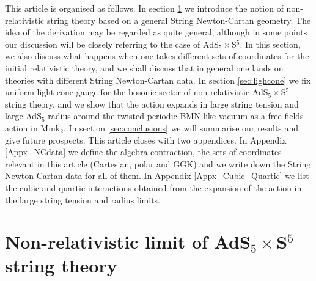 \documentclass[12pt]{article}
\numberwithin{equation}{section}
\begin{document}
This article is organised as follows.  In section \ref{sec:non_rel_general} we introduce the notion of non-relativistic string theory based on a general String Newton-Cartan geometry. The idea of the derivation may be regarded as quite general, although in some points our discussion will be closely referring to the case of AdS$_5\times$S$^5$.  In this section, we also discuss what happens when one takes different sets of coordinates for the initial relativistic theory, and we shall discuss that in general one lands on theories with different String Newton-Cartan data.
In section \ref{sec:lighcone} we fix uniform light-cone gauge for the bosonic sector of non-relativistic AdS$_5\times$S$^5$ string theory, and we show that the action expands in large string tension and large AdS$_5$ radius around the twisted periodic BMN-like vacuum as a free fields action in Mink$_2$. In section \ref{sec:conclusions} we will summarise our results and give future prospects. This article closes with two appendices. In Appendix \ref{Appx_NCdata} we define the algebra contraction, the sets of coordinates relevant in this article (Cartesian, polar and GGK) and we write down the String Newton-Cartan data for all of them.  In Appendix \ref{Appx_Cubic_Quartic} we list the cubic and quartic interactions obtained from the expansion of the action in the large string tension and radius limits. 




\section{Non-relativistic limit of AdS$_5\times$S$^5$ string theory}
\label{sec:non_rel_general}
\end{document}
